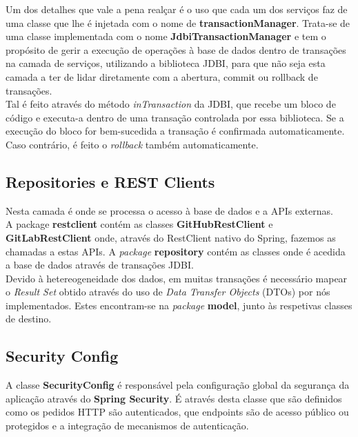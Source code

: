 Um dos detalhes que vale a pena realçar é o uso que cada um dos serviços faz de uma classe que lhe é injetada com o nome de \textbf{transactionManager}. Trata-se de uma classe implementada com o nome \textbf{JdbiTransactionManager} e tem o propósito de gerir a execução de operações à base de dados dentro de transações na camada de serviços, utilizando a biblioteca JDBI, para que não seja esta camada a ter de lidar diretamente com a abertura, commit ou rollback de transações. \\

Tal é feito através do método \textit{inTransaction} da JDBI, que recebe um bloco de código e executa-a dentro de uma transação controlada por essa biblioteca. Se a execução do bloco for bem-sucedida a transação é confirmada automaticamente. Caso contrário, é feito o \textit{rollback} também automaticamente. \\

\subsection{Repositories e REST Clients}
Nesta camada é onde se processa o acesso à base de dados e a APIs externas. \\

A package \textbf{restclient} contém as classes \textbf{GitHubRestClient} e \textbf{GitLabRestClient} onde, através do RestClient nativo do Spring, fazemos as chamadas a estas APIs. A \textit{package} \textbf{repository} contém as classes onde é acedida a base de dados através de transações JDBI. \\

Devido à hetereogeneidade dos dados, em muitas transações é necessário mapear o \textit{Result Set} obtido através do uso de \textit{Data Transfer Objects} (DTOs) por nós implementados. Estes encontram-se na \textit{package} \textbf{model}, junto às respetivas classes de destino. \\

\subsection{Security Config}
A classe \textbf{SecurityConfig} é responsável pela configuração global da segurança da aplicação através do \textbf{Spring Security}. É através desta classe que são definidos como os pedidos HTTP são autenticados, que endpoints são de acesso público ou protegidos e a integração de mecanismos de autenticação. \\

